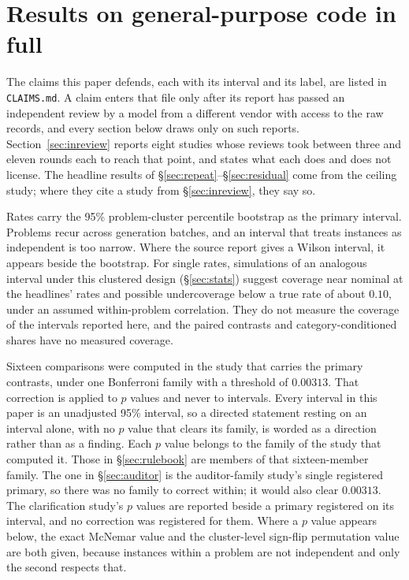 \section{Results on general-purpose code in full}
\label{sec:results}
The claims this paper defends, each with its interval and its label, are listed in
\texttt{CLAIMS.md}. A claim enters that file only after its report has passed an independent
review by a model from a different vendor with access to the raw records, and every section below
draws only on such reports. Section~\ref{sec:inreview} reports eight studies whose reviews took
between three and eleven rounds each to reach that point, and states what each does and does not
license. The headline results of \S\ref{sec:repeat}--\S\ref{sec:residual} come from the ceiling
study; where they cite a study from \S\ref{sec:inreview}, they say so.

Rates carry the 95\% problem-cluster percentile bootstrap as the primary interval. Problems recur
across generation batches, and an interval that treats instances as independent is too narrow.
Where the source report gives a Wilson interval, it appears beside the bootstrap. For single
rates, simulations of an analogous interval under this clustered design (\S\ref{sec:stats})
suggest coverage near nominal at the headlines' rates and possible undercoverage below a true rate
of about $0.10$, under an assumed within-problem correlation. They do not measure the coverage of
the intervals reported here, and the paired contrasts and category-conditioned shares have no
measured coverage.

Sixteen comparisons were computed in the study that carries the primary contrasts, under one
Bonferroni family with a threshold of $0.00313$. That correction is applied to $p$ values and
never to intervals. Every interval in this paper is an unadjusted 95\% interval, so a directed
statement resting on an interval alone, with no $p$ value that clears its family, is worded as a
direction rather than as a finding. Each $p$ value belongs to the family of the study that computed
it. Those in \S\ref{sec:rulebook} are members of that sixteen-member family. The one in
\S\ref{sec:auditor} is the auditor-family study's single registered primary, so there was no family
to correct within; it would also clear $0.00313$. The clarification study's $p$ values are reported
beside a primary registered on its interval, and no correction was registered for them. Where a $p$ value appears
below, the exact McNemar value and the cluster-level sign-flip permutation value are both given,
because instances within a problem are not independent and only the second respects that.



